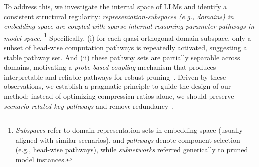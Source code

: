 To address this, we investigate the internal space of LLMs and identify a consistent structural regularity: \emph{representation-subspaces (e.g., domains) in embedding-space are coupled with sparse internal reasoning parameter-pathways in model-space.}%
\footnote{\emph{Subspaces} refer to domain representation sets in embedding space (usually aligned with similar scenarios), and \emph{pathways} denote component selection (e.g., head-wise pathways), while \emph{subnetworks} referred generically to pruned model instances.}
Specifically, (i) for each quasi-orthogonal domain subspace, only a subset of head-wise computation pathways is repeatedly activated, suggesting a stable pathway set. And (ii) these pathway sets are partially separable across domains, motivating a \emph{probe-based coupling} mechanism that produces interpretable and reliable pathways for robust pruning~\cite{tenenbaum2000isomap,yao2024gpruner,gao2024sae_scaling}. 
Driven by these observations, we establish a pragmatic principle to guide the design of our method:
instead of optimizing compression ratios alone, we should preserve \emph{scenario-related key pathways} and remove redundancy~\cite{zhang2024structuredpruning_llm,he2025olica}.

